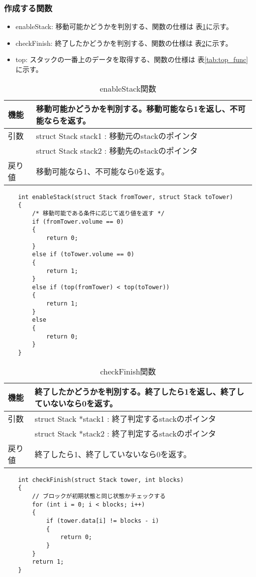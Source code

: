 \documentclass[dvipdfmx]{jsarticle}
\begin{document}
\subsubsection{作成する関数}
\begin{itemize}
  \item enableStack: 移動可能かどうかを判別する、関数の仕様は 表\ref{tab:enablestack_func}に示す。
  \item checkFinish: 終了したかどうかを判別する、関数の仕様は 表\ref{tab:checkfinish_func}に示す。
  \item top: スタックの一番上のデータを取得する、関数の仕様は 表\ref{tab:top_func}に示す。
\end{itemize}
\begin{table}[ht]
  \centering
  \begin{tabular}{|p{5cm}|p{10cm}|}
    \hline
    機能  & 移動可能かどうかを判別する。移動可能なら1を返し、不可能ならを返す。   \\
    \hline
    引数  & struct Stack stack1 : 移動元のstackのポインタ \\
        & struct Stack stack2 : 移動先のstackのポインタ \\
    \hline
    戻り値 & 移動可能なら1、不可能なら0を返す。                   \\
  \end{tabular}
  \begin{lstlisting}
    int enableStack(struct Stack fromTower, struct Stack toTower)
    {
        /* 移動可能である条件に応じて返り値を返す */
        if (fromTower.volume == 0)
        {
            return 0;
        }
        else if (toTower.volume == 0)
        {
            return 1;
        }
        else if (top(fromTower) < top(toTower))
        {
            return 1;
        }
        else
        {
            return 0;
        }
    }
  \end{lstlisting}
  \caption{enableStack関数}
  \label{tab:enablestack_func}
\end{table}
\begin{table}[ht]
  \centering
  \begin{tabular}{|p{5cm}|p{10cm}|}
    \hline
    機能  & 終了したかどうかを判別する。終了したら1を返し、終了していないなら0を返す。  \\
    \hline
    引数  & struct Stack *stack1 : 終了判定するstackのポインタ \\
        & struct Stack *stack2 : 終了判定するstackのポインタ \\
    \hline
    戻り値 & 終了したら1、終了していないなら0を返す。                   \\
  \end{tabular}
  \begin{lstlisting}
    int checkFinish(struct Stack tower, int blocks)
    {
        // ブロックが初期状態と同じ状態かチェックする
        for (int i = 0; i < blocks; i++)
        {
            if (tower.data[i] != blocks - i)
            {
                return 0;
            }
        }
        return 1;
    }
  \end{lstlisting}
  \caption{checkFinish関数}
  \label{tab:checkfinish_func}
\end{table}
\end{document}
